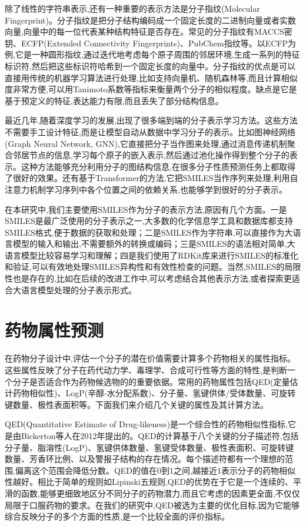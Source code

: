 除了线性的字符串表示,还有一种重要的表示方法是分子指纹(Molecular Fingerprint)。分子指纹是把分子结构编码成一个固定长度的二进制向量或者实数向量,向量中的每一位代表某种结构特征是否存在。常见的分子指纹有MACCS密钥、ECFP(Extended Connectivity Fingerprints)、PubChem指纹等。以ECFP为例,它是一种圆形指纹,通过迭代地考虑每个原子周围的邻居环境,生成一系列的特征标识符,然后把这些标识符哈希到一个固定长度的向量中。分子指纹的优点是可以直接用传统的机器学习算法进行处理,比如支持向量机、随机森林等,而且计算相似度非常方便,可以用Tanimoto系数等指标来衡量两个分子的相似程度。缺点是它是基于预定义的特征,表达能力有限,而且丢失了部分结构信息。

最近几年,随着深度学习的发展,出现了很多端到端的分子表示学习方法。这些方法不需要手工设计特征,而是让模型自动从数据中学习分子的表示。比如图神经网络(Graph Neural Network, GNN),它直接把分子当作图来处理,通过消息传递机制聚合邻居节点的信息,学习每个原子的嵌入表示,然后通过池化操作得到整个分子的表示。这种方法能够充分利用分子的图结构信息,在很多分子性质预测任务上都取得了很好的效果。还有基于Transformer的方法,它把SMILES当作序列来处理,利用自注意力机制学习序列中各个位置之间的依赖关系,也能够学到很好的分子表示。

在本研究中,我们主要使用SMILES作为分子的表示方法,原因有几个方面。一是SMILES是最广泛使用的分子表示之一,大多数的化学信息学工具和数据库都支持SMILES格式,便于数据的获取和处理；二是SMILES作为字符串,可以直接作为大语言模型的输入和输出,不需要额外的转换或编码；三是SMILES的语法相对简单,大语言模型比较容易学习和理解；四是我们使用了RDKit库来进行SMILES的标准化和验证,可以有效地处理SMILES异构性和有效性检查的问题。当然,SMILES的局限性也是存在的,比如在后续的改进工作中,可以考虑结合其他表示方法,或者探索更适合大语言模型处理的分子表示形式。

\section{药物属性预测}

在药物分子设计中,评估一个分子的潜在价值需要计算多个药物相关的属性指标。这些属性反映了分子在药代动力学、毒理学、合成可行性等方面的特性,是判断一个分子是否适合作为药物候选物的的重要依据。常用的药物属性包括QED(定量估计药物相似性)、LogP(辛醇-水分配系数)、分子量、氢键供体/受体数量、可旋转键数量、极性表面积等。下面我们来介绍几个关键的属性及其计算方法。

QED(Quantitative Estimate of Drug-likeness)是一个综合性的药物相似性指标,它是由Bickerton等人在2012年提出的。QED的计算基于八个关键的分子描述符,包括分子量、脂溶性(LogP)、氢键供体数量、氢键受体数量、极性表面积、可旋转键数量、芳香环比例、以及警报子结构的存在情况。每个描述符都有一个理想的范围,偏离这个范围会降低分数。QED的值在0到1之间,越接近1表示分子的药物相似性越好。相比于简单的规则如Lipinski五规则,QED的优势在于它是一个连续的、平滑的函数,能够更细致地区分不同分子的药物潜力,而且它考虑的因素更全面,不仅仅局限于口服药物的要求。在我们的研究中,QED被选为主要的优化目标,因为它能够综合反映分子的多个方面的性质,是一个比较全面的评价指标。

